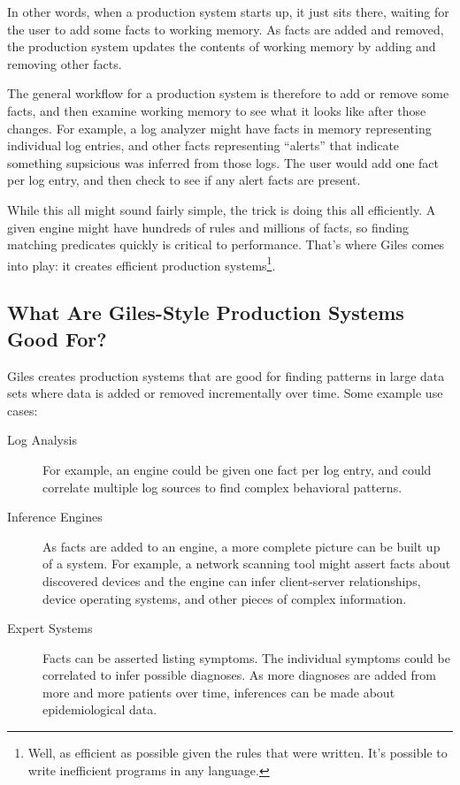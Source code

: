 \documentclass[letterpaper,10pt]{article}
\begin{document}
In other words, when a production system starts up, it just sits there, waiting for the user to add some facts to working memory.
As facts are added and removed, the production system updates the contents of working memory by adding and removing other facts.

The general workflow for a production system is therefore to add or remove some facts, and then examine working memory to see what it looks like after those changes.
For example, a log analyzer might have facts in memory representing individual log entries, and other facts representing ``alerts'' that indicate something supsicious was inferred from those logs.
The user would add one fact per log entry, and then check to see if any alert facts are present.

While this all might sound fairly simple, the trick is doing this all efficiently.
A given engine might have hundreds of rules and millions of facts, so finding matching predicates quickly is critical to performance.
That's where Giles comes into play: it creates efficient production systems\footnote{Well, as efficient as possible given the rules that were written.
It's possible to write inefficient programs in any language.}.

\subsection{What Are Giles-Style Production Systems Good For?}
Giles creates production systems that are good for finding patterns in large data sets where data is added or removed incrementally over time.
Some example use cases:

\begin{description}
    \item[Log Analysis] For example, an engine could be given one fact per log entry, and could correlate multiple log sources to find complex behavioral patterns.
    \item[Inference Engines] As facts are added to an engine, a more complete picture can be built up of a system. For example, a network scanning tool might assert facts about discovered devices and the engine can infer client-server relationships, device operating systems, and other pieces of complex information.
    \item[Expert Systems] Facts can be asserted listing symptoms. The individual symptoms could be correlated to infer possible diagnoses. As more diagnoses are added from more and more patients over time, inferences can be made about epidemiological data.
\end{description}
\end{document}
